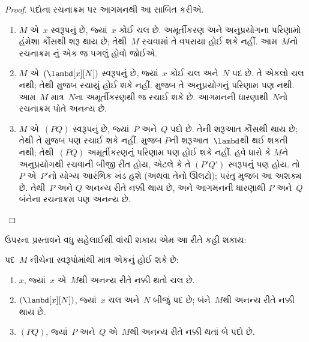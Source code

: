 \begin{proof}
  પદોના રચનાક્રમ પર આગમનથી આ સાબિત કરીએ.
  \begin{enumerate}
    \item $M$ એ~$x$ સ્વરૂપનું છે, જ્યાં~$x$ કોઈ ચલ છે.
      અમૂર્તીકરણ અને અનુપ્રયોગના પરિણામો હંમેશા કૌંસથી શરૂ
      થાય છે; તેથી~$M$ રચવામાં તે વપરાયા હોઈ શકે નહીં.
      આમ~$M$નો રચનાક્રમ
      નું
      એક જ પગલું હોવો જોઈએ.
    \item $M$ એ~$(\lambd[x][N])$ સ્વરૂપનું છે, જ્યાં~$x$
      કોઈ ચલ અને~$N$ પદ છે. તે એકલો ચલ નથી; તેથી
      મુજબ રચાયું હોઈ શકે નહીં.  મુજબ
      તે અનુપ્રયોગનું પરિણામ પણ નથી. આમ~$M$ માત્ર~$N$ના
      અમૂર્તીકરણથી જ રચાઈ શકે છે. આગમનની ધારણાથી~$N$નો
      રચનાક્રમ પોતે અનન્ય છે.
    \item $M$ એ~$(PQ)$ સ્વરૂપનું છે, જ્યાં~$P$ અને~$Q$
      પદો છે. તેની શરૂઆત કૌંસથી થાય છે; તેથી તે
      મુજબ પણ રચાઈ શકે નહીં.  મુજબ
      $P$ની શરૂઆત~$\lambd$થી થઈ શકતી નથી; તેથી~$(PQ)$
      અમૂર્તીકરણનું પરિણામ પણ હોઈ શકે નહીં. હવે ધારો કે
      $M$ને અનુપ્રયોગથી રચવાની બીજી રીત હોય, એટલે કે તે
      $(P'Q')$ સ્વરૂપનું પણ હોય. તો~$P$ એ~$P'$નો યોગ્ય
      આરંભિક ખંડ હશે (અથવા તેનો ઊલટો); પરંતુ
       મુજબ આ અશક્ય છે. તેથી~$P$ અને
      $Q$ અનન્ય રીતે નક્કી થાય છે, અને આગમનની ધારણાથી
      $P$ અને~$Q$ બંનેના રચનાક્રમ પણ અનન્ય છે.
  \end{enumerate}
\end{proof}

ઉપરના પ્રસ્તાવને વધુ સહેલાઈથી વાંચી શકાય એમ આ રીતે કહી શકાય:
\begin{prop}
  પદ~$M$ નીચેના સ્વરૂપોમાંથી માત્ર એકનું હોઈ શકે છે:
  \begin{enumerate}
    \item $x$, જ્યાં~$x$ એ~$M$થી અનન્ય રીતે નક્કી થતો ચલ છે.
    \item $(\lambd[x][N])$, જ્યાં~$x$ ચલ અને~$N$ બીજું
      પદ છે; બંને~$M$થી અનન્ય રીતે નક્કી થાય છે.
    \item $(PQ)$, જ્યાં~$P$ અને~$Q$ એ~$M$થી અનન્ય રીતે
      નક્કી થતાં બે પદો છે.
  \end{enumerate}
\end{prop}
\endgroup


\begingroup
\makeatletter{}\makeatother

\label{guunit:OLP-0359}


